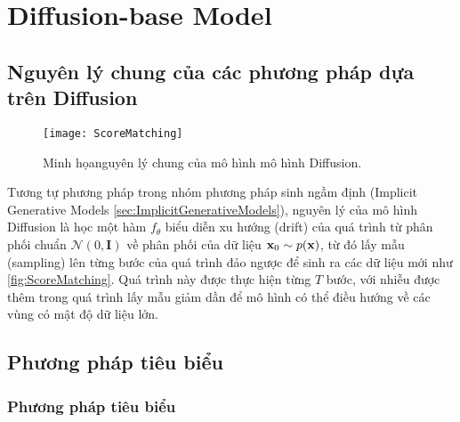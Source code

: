 \section{Diffusion-base Model}
\label{sec:diffusionbase}

\subsection{Nguyên lý chung của các phương pháp dựa trên Diffusion}

\begin{figure}[H]
	\centering
	\texttt{[image: ScoreMatching]}
	\caption{Minh họanguyên lý chung của mô hình mô hình Diffusion.}
	\label{fig:ScoreMatching}
\end{figure}

Tương tự phương pháp trong nhóm phương pháp sinh ngầm định (Implicit Generative Models \autoref{sec:ImplicitGenerativeModels}), nguyên lý của mô hình Diffusion là học một hàm $f_{\theta}$ biểu diễn xu hướng (drift) của quá trình từ phân phối chuẩn $\mathcal{N}(0, \mathbf{I})$ về phân phối của dữ liệu $\mathbf{x}_{0} \sim p(\mathbf{x})$, từ đó lấy mẫu (sampling) lên từng bước của quá trình đảo ngược để sinh ra các dữ liệu mới như \autoref{fig:ScoreMatching}.
Quá trình này được thực hiện từng $T$ bước, với nhiễu được thêm trong quá trình lấy mẫu giảm dần để mô hình có thể điều hướng về các vùng có mật độ dữ liệu lớn.

\subsection{Phương pháp tiêu biểu}
\label{subsec:TypicalMethod}

\subsubsection{Phương pháp tiêu biểu}

